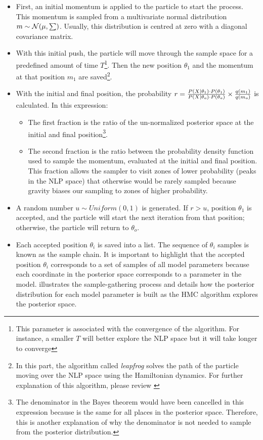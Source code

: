 \begin{itemize}
    \item First, an initial momentum is applied to the particle to start the process. This momentum is sampled from a multivariate normal distribution $m \sim \mathcal{N}(\mu, \scriptsize{\sum}\normalsize)$. Usually, this distribution is centred at zero with a diagonal covariance matrix.

    \item With this initial push, the particle will move through the sample space for a predefined amount of time $T$\footnote{This parameter is associated with the convergence of the algorithm. For instance, a smaller $T$ will better explore the NLP space but it will take longer to converge}. Then the new position ${\theta_{1}}$ and the momentum at that position $m_1$ are saved\footnote{In this part, the algorithm called \textit{leapfrog} solves the path of the particle moving over the NLP space using the Hamiltonian dynamics. For further explanation of this algorithm, please review \citep{Neal2012}}.

    \item With the initial and final position, the probability $r = \frac{P(X|\theta_{1})\cdot P(\theta_{1})}{P(X|\theta_{o})\cdot P(\theta_{o})}\footnotesize\times \normalsize\frac{q(m_1)}{q(m_o)}$ is calculated. In this expression:
    \begin{itemize}
        \item The first fraction is the ratio of the un-normalized posterior space at the initial and final position\footnote{The denominator in the Bayes theorem would have been cancelled in this expression because is the same for all places in the posterior space. Therefore, this is another explanation of why the denominator is not needed to sample from the posterior distribution.}.
        \item The second fraction is the ratio between the probability density function used to sample the momentum, evaluated at the initial and final position. This fraction allows the sampler to visit zones of lower probability (peaks in the NLP space) that otherwise would be rarely sampled because gravity biases our sampling to zones of higher probability.
    \end{itemize}
    \item A random number $u \sim Uniform(0,1)$ is generated. If $r>u$, position ${\theta_{1}}$ is accepted, and the particle will start the next iteration from that position; otherwise, the particle will return to ${\theta_{o}}$.
    \item Each accepted position ${\theta_{i}}$ is saved into a list. The sequence of ${\theta_{i}}$ samples is known as the sample chain. It is important to highlight that the accepted position ${\theta_{i}}$ corresponds to a set of samples of all model parameters because each coordinate in the posterior space corresponds to a parameter in the model.  illustrates the sample-gathering process and details how the posterior distribution for each model parameter is built as the HMC algorithm explores the posterior space.    
\end{itemize}


